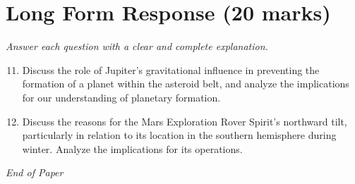 \documentclass[12pt]{article}
\begin{document}
\section*{Long Form Response (20 marks)}
\textit{Answer each question with a clear and complete explanation.}
\begin{enumerate}[label=\arabic*.]
\setcounter{enumi}{10}
\item Discuss the role of Jupiter's gravitational influence in preventing the formation of a planet within the asteroid belt, and analyze the implications for our understanding of planetary formation.
\item Discuss the reasons for the Mars Exploration Rover Spirit's northward tilt, particularly in relation to its location in the southern hemisphere during winter. Analyze the implications for its operations.
\end{enumerate}

\vfill
\noindent\textit{End of Paper}
\end{document}
